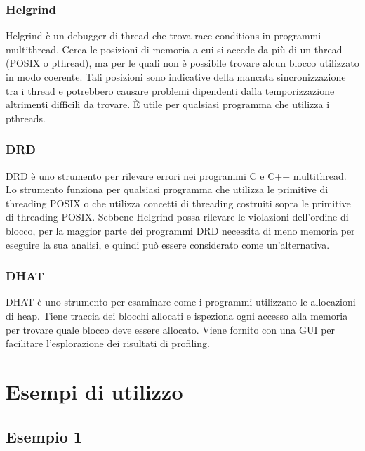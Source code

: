 \documentclass{article}
\begin{document}
\subsubsection{Helgrind}

Helgrind è un debugger di thread che trova race conditions in programmi
multithread. Cerca le posizioni di memoria a cui si accede da più di un thread
(POSIX o pthread), ma per le quali non è possibile trovare alcun blocco
utilizzato in modo coerente. Tali posizioni sono indicative
della mancata sincronizzazione tra i thread e potrebbero causare problemi
dipendenti dalla temporizzazione altrimenti difficili da trovare. È utile per qualsiasi
programma che utilizza i pthreads.

\subsubsection{DRD}

DRD è uno strumento per rilevare errori nei programmi C e C++ multithread. Lo
strumento funziona per qualsiasi programma che utilizza le primitive di
threading POSIX o che utilizza concetti di threading costruiti sopra le
primitive di threading POSIX. Sebbene Helgrind possa rilevare le violazioni
dell'ordine di blocco, per la maggior parte dei programmi DRD necessita di meno
memoria per eseguire la sua analisi, e quindi può essere considerato come
un'alternativa.

\subsubsection{DHAT}

DHAT è uno strumento per esaminare come i programmi utilizzano le allocazioni di
heap. Tiene traccia dei blocchi allocati e ispeziona ogni accesso alla memoria
per trovare quale blocco deve essere allocato. Viene fornito con una GUI per
facilitare l'esplorazione dei risultati di profiling.


\section{Esempi di utilizzo}

\subsection{Esempio 1}
\label{sec:esempio1}
\end{document}
